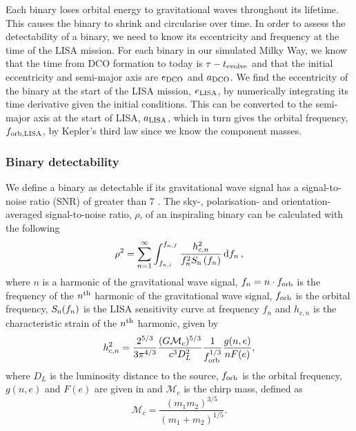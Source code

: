 Each binary loses orbital energy to gravitational waves throughout its lifetime. This causes the binary to shrink and circularise over time. In order to assess the detectability of a binary, we need to know its eccentricity and frequency at the time of the LISA mission. For each binary in our simulated Milky Way, we know that the time from DCO formation to today is $\tau - t_{\rm evolve}$ and that the initial eccentricity and semi-major axis are $e_{\rm DCO}$ and $a_{\rm DCO}$. We find the eccentricity of the binary at the start of the LISA mission, $e_{\rm LISA}$, by numerically integrating its time derivative \citep[][Eq. 5.13]{Peters+1964} given the initial conditions. This can be converted to the semi-major axis at the start of LISA, $a_{\rm LISA} $\citep[][Eq. 5.11]{Peters+1964}, which in turn gives the orbital frequency, $f_{\rm orb, LISA}$, by Kepler's third law since we know the component masses.

\subsubsection{Binary detectability}

We define a binary as detectable if its gravitational wave signal has a signal-to-noise ratio (SNR) of greater than 7 \citep[e.g.][]{Breivik+2020, Korol+2020}. The sky-, polarisation- and orientation-averaged signal-to-noise ratio, $\rho$, of an inspiraling binary can be calculated with the following \citep[e.g.][]{Finn+2000}
\begin{equation}\label{eq:snr}
    \rho^2 = \sum_{n=1}^{\infty} \int_{f_{n, i}}^{f_{n, f}} \frac{h_{c, n}^{2}}{f_{n}^{2} S_{\rm n}\left(f_{n}\right)} \dd{f_n},
\end{equation}
where $n$ is a harmonic of the gravitational wave signal, $f_n = n \cdot f_{\rm orb}$ is the frequency of the $n^{\rm th}$ harmonic of the gravitational wave signal, $f_{\rm orb}$ is the orbital frequency, $S_{\rm n}(f_n)$ is the LISA sensitivity curve at frequency $f_n$ \citep[e.g.][]{Robson+2019} and $h_{c,n}$ is the characteristic strain of the $n^{\rm th}$ harmonic, given by \citep[e.g.][]{Barack+2004}
\begin{equation}\label{eq:charstrain}
    h^2_{c,n} = \frac{2^{5/3}}{3 \pi^{4/3}} \frac{(G \mathcal{M}_c)^{5/3}}{c^3 D_L^2} \frac{1}{f_{\rm orb}^{1/3}} \frac{g(n,e)}{n F(e)},
\end{equation}
where $D_L$ is the luminosity distance to the source, $f_{\rm orb}$ is the orbital frequency, $g(n, e)$ and $F(e)$ are given in \citet{Peters+1963} and $\mathcal{M}_c$ is the chirp mass, defined as
\begin{equation}\label{eq:chirp_mass}
    \mathcal{M}_c = \frac{(m_1 m_2)^{3/5}}{(m_1 + m_2)^{1/5}}.
\end{equation}


